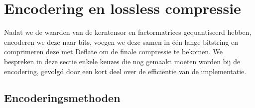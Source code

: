 \section{Encodering en lossless compressie}
\label{sec:encodering}

Nadat we de waarden van de kerntensor en factormatrices gequantiseerd hebben, encoderen we deze naar bits, voegen we deze samen in \'e\'en lange bitstring en comprimeren deze met Deflate om de finale compressie te bekomen. We bespreken in deze sectie enkele keuzes die nog gemaakt moeten worden bij de encodering, gevolgd door een kort deel over de effici\"entie van de implementatie.

\subsection{Encoderingsmethoden}

